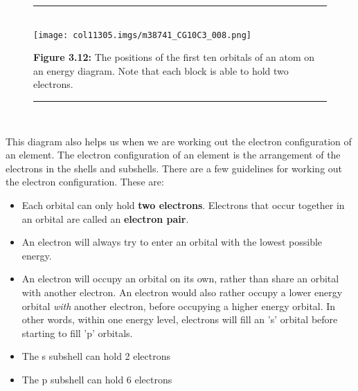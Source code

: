     \setcounter{subfigure}{0}
	\begin{figure}[H] %
    \begin{center}
    \rule[.1in]{\figurerulewidth}{.005in} \\
        \label{m38741*uid92!!!underscore!!!media}\label{m38741*uid92!!!underscore!!!printimage}\texttt{[image: col11305.imgs/m38741\_CG10C3\_008.png]} %
      \vspace{2pt}
    \vspace{\rubberspace}\par \begin{cnxcaption}
	  \small \textbf{Figure 3.12: }The positions of the first ten orbitals of an atom on an energy diagram. Note that each block is able to hold two electrons.
	\end{cnxcaption}
    \vspace{.1in}
    \rule[.1in]{\figurerulewidth}{.005in} \\
    \end{center}
 \end{figure}       
        \label{m38741*eip-752}This diagram also helps us when we are working out the electron configuration of an element. The electron configuration of an element is the arrangement of the electrons in the shells and subshells. There are a few guidelines for working out the electron configuration. These are:
\par \label{m38741*id259303}\begin{itemize}[noitemsep]
            \label{m38741*uid93}\item Each orbital can only hold \textbf{two electrons}. Electrons that occur together in an orbital are called an \textbf{electron pair}.
\label{m38741*uid94}\item An electron will always try to enter an orbital with the lowest possible energy.
\label{m38741*uid95}\item An electron will occupy an orbital on its own, rather than share an orbital with another electron. An electron would also rather occupy a lower energy orbital \textsl{with} another electron, before occupying a higher energy orbital. In other words, within one energy level, electrons will fill an 's' orbital before starting to fill 'p' orbitals.
\label{m38741*uid83}\item The s subshell can hold 2 electrons
\label{m38741*uid84}\item The p subshell can hold 6 electrons
\end{itemize}
